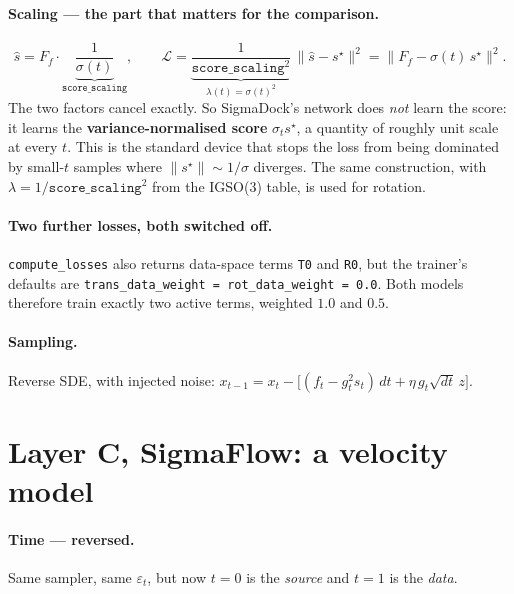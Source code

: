 \documentclass[11pt,a4paper]{report}
\theoremstyle{definition}
\theoremstyle{remark}
\newcommand{\pyfunc}[1]{\texttt{#1}}
\begin{document}
\paragraph{Scaling --- the part that matters for the comparison.}
\begin{equation}
\hat s = F_f\cdot\underbrace{\frac{1}{\sigma(t)}}_{\texttt{score\_scaling}},
\qquad
\mathcal L = \underbrace{\frac{1}{\texttt{score\_scaling}^2}}_{\lambda(t)=\sigma(t)^2}\,
\bigl\|\hat s - s^\star\bigr\|^2
= \bigl\|F_f - \sigma(t)\,s^\star\bigr\|^2 .
\end{equation}
The two factors cancel exactly. So SigmaDock's network does \emph{not} learn
the score: it learns the \textbf{variance-normalised score} $\sigma_t s^\star$,
a quantity of roughly unit scale at every $t$. This is the standard device
that stops the loss from being dominated by small-$t$ samples where
$\|s^\star\|\sim1/\sigma$ diverges. The same construction, with
$\lambda=1/\texttt{score\_scaling}^2$ from the IGSO(3) table, is used for
rotation.

\paragraph{Two further losses, both switched off.} \pyfunc{compute\_losses}
also returns data-space terms \texttt{T0} and \texttt{R0}, but the trainer's
defaults are \texttt{trans\_data\_weight = rot\_data\_weight = 0.0}. Both
models therefore train exactly two active terms, weighted $1.0$ and $0.5$.

\paragraph{Sampling.} Reverse SDE, with injected noise:
$x_{t-1} = x_t - \bigl[(f_t - g_t^2s_t)\,dt + \eta\,g_t\sqrt{dt}\,z\bigr]$.

\section{Layer C, SigmaFlow: a velocity model}
\label{sec:engine-sigmaflow}

\paragraph{Time --- reversed.} Same sampler, same $\varepsilon_t$, but now
$t=0$ is the \emph{source} and $t=1$ is the \emph{data}.
\end{document}
